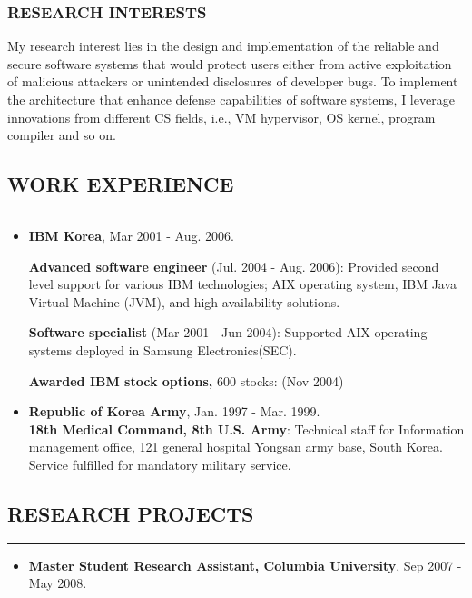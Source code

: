 \documentclass[10pt,a4]{article}
\begin{document}
\begin{small}
\subsubsection*{RESEARCH INTERESTS}

\begin{list}{}{}
\item My research interest lies in the design and implementation of the
        reliable and secure software systems that would protect users either
        from active exploitation of malicious attackers or unintended
        disclosures of developer bugs. To implement the architecture that
        enhance defense capabilities of software systems, I leverage
        innovations from different CS fields, i.e., VM hypervisor, OS kernel,
        program compiler and so on.
%
\end{list}

\subsection*{WORK EXPERIENCE}
\hrule
\vspace{0.2cm}
\begin{itemize}
\item {\bf IBM Korea},  Mar 2001 - Aug. 2006. 

  {\bf Advanced software engineer} (Jul. 2004 - Aug. 2006): Provided second
  level support for various IBM technologies; AIX operating system, IBM Java
  Virtual Machine (JVM), and high availability solutions.

  {\bf Software specialist} (Mar 2001 - Jun 2004): Supported AIX operating
  systems deployed in Samsung Electronics(SEC).

  {\bf Awarded IBM stock options,} 600 stocks: (Nov 2004) 
  \\

\item {\bf Republic of Korea Army}, Jan. 1997 - Mar. 1999. \\
        {\bf 18th Medical Command, 8th U.S. Army}: Technical staff for
        Information management office, 121 general hospital Yongsan army base,
        South Korea. Service fulfilled for mandatory military service.

\end{itemize}

\subsection*{RESEARCH PROJECTS}
\hrule
\vspace{0.2cm}
\begin{itemize}
\item {\bf Master Student Research Assistant, Columbia University}, Sep 2007 - May 2008.


\end{itemize}
\end{small}
\end{document}
